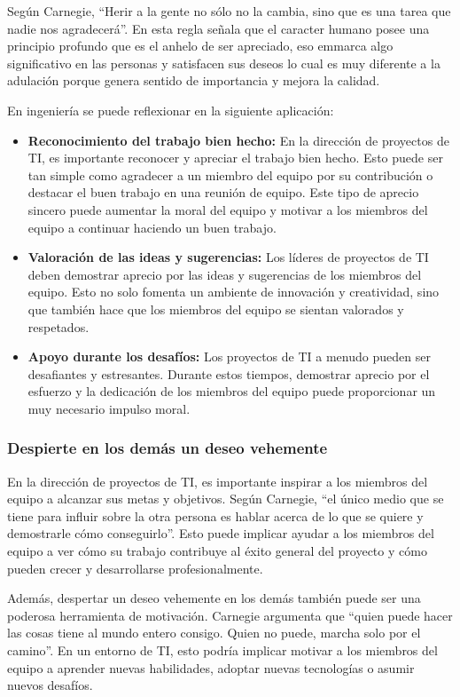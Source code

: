 \documentclass[journal]{IEEEtran}
\begin{document}
Según Carnegie, “Herir a la gente no sólo no la cambia, sino que es una tarea que nadie nos agradecerá”. En esta regla señala que el caracter humano posee una principio profundo que es el anhelo de ser apreciado, eso emmarca algo significativo en las personas y satisfacen sus deseos lo cual es muy diferente a la adulación porque genera sentido de importancia y mejora la calidad.

En ingeniería se puede reflexionar en la siguiente aplicación:
\begin{itemize}
	\item \textbf{Reconocimiento del trabajo bien hecho:} En la dirección de proyectos de TI, es importante reconocer y apreciar el trabajo bien hecho. Esto puede ser tan simple como agradecer a un miembro del equipo por su contribución o destacar el buen trabajo en una reunión de equipo. Este tipo de aprecio sincero puede aumentar la moral del equipo y motivar a los miembros del equipo a continuar haciendo un buen trabajo.
	\item \textbf{Valoración de las ideas y sugerencias:} Los líderes de proyectos de TI deben demostrar aprecio por las ideas y sugerencias de los miembros del equipo. Esto no solo fomenta un ambiente de innovación y creatividad, sino que también hace que los miembros del equipo se sientan valorados y respetados.
	\item \textbf{Apoyo durante los desafíos:} Los proyectos de TI a menudo pueden ser desafiantes y estresantes. Durante estos tiempos, demostrar aprecio por el esfuerzo y la dedicación de los miembros del equipo puede proporcionar un muy necesario impulso moral.
\end{itemize}

\subsubsection{Despierte en los demás un deseo vehemente}
En la dirección de proyectos de TI, es importante inspirar a los miembros del equipo a alcanzar sus metas y objetivos. Según Carnegie, “el único medio que se tiene para influir sobre la otra persona es hablar acerca de lo que se quiere y demostrarle cómo conseguirlo”. Esto puede implicar ayudar a los miembros del equipo a ver cómo su trabajo contribuye al éxito general del proyecto y cómo pueden crecer y desarrollarse profesionalmente.

Además, despertar un deseo vehemente en los demás también puede ser una poderosa herramienta de motivación. Carnegie argumenta que “quien puede hacer las cosas tiene al mundo entero consigo. Quien no puede, marcha solo por el camino”. En un entorno de TI, esto podría implicar motivar a los miembros del equipo a aprender nuevas habilidades, adoptar nuevas tecnologías o asumir nuevos desafíos.
\end{document}
